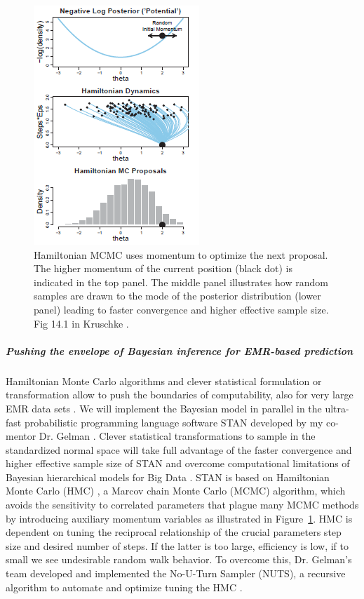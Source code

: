 \documentclass[11pt,notitlepage]{article}
\begin{document}
\begin{figure}
 \vspace{-70pt}
 \includegraphics[scale=1]{Figures/Hamiltonian.png}
  \vspace{-30pt}
  \caption{\footnotesize Hamiltonian MCMC uses momentum to optimize the next proposal. The higher momentum of the current position (black dot) is indicated in the top panel. The middle panel illustrates how random samples are drawn to the mode of the posterior distribution (lower panel) leading to faster convergence and higher effective sample size. Fig 14.1 in Kruschke \cite{Kruschke_Book_2014}.}
    \label{fig:Hamiltonian}
 \vspace{- 1 pt}
\end{figure}

\subparagraph{Pushing the envelope of Bayesian inference for EMR-based prediction}
Hamiltonian Monte Carlo algorithms \cite{Stan_Software_2014} and clever statistical formulation or transformation allow to push the boundaries of computability, also for very large EMR data sets \cite{Gelman-Hill_2014}.  We will implement the Bayesian model in parallel in the ultra-fast probabilistic programming language software STAN developed by my co-mentor Dr. Gelman \cite{Stan_Software_2014}. Clever statistical transformations to sample in the standardized normal space will take full advantage of the faster convergence and higher effective sample size of STAN and overcome computational limitations of Bayesian hierarchical models for Big Data \cite{Gelman-Hill_2014}. STAN  is based on Hamiltonian Monte Carlo (HMC) \cite{Gelman-Hill_2014}, a Marcov chain Monte Carlo (MCMC) algorithm, which avoids the sensitivity to correlated parameters that plague many MCMC methods by introducing auxiliary momentum variables \cite{Homan_Gelman_NUTS_2014} as illustrated in Figure~\ref{fig:Hamiltonian}. HMC is dependent  on tuning the reciprocal relationship of the crucial parameters step size and desired number of steps. If the latter is too large, efficiency is low, if to small we see undesirable random walk behavior. To overcome this, Dr. Gelman's team developed and implemented the No-U-Turn Sampler (NUTS), a recursive algorithm to automate and optimize tuning the HMC \cite{Homan_Gelman_NUTS_2014}.
  
\end{document}
